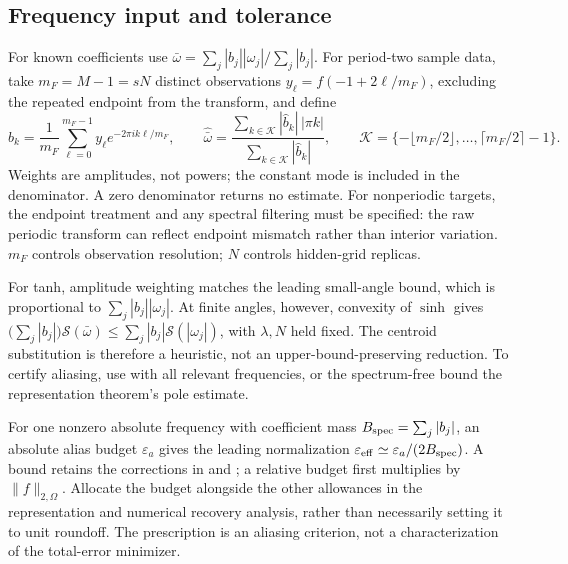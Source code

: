 \documentclass[11pt]{article}
\begin{document}
\subsection{Frequency input and tolerance}
For known coefficients use
$\bar\omega=\sum_j|b_j||\omega_j|/\sum_j|b_j|$.
For period-two sample data, take $m_F=M-1=sN$ distinct observations
$y_\ell=f(-1+2\ell/m_F)$, excluding the repeated endpoint from the transform,
and define
\begin{equation}
 \widehat b_k=\frac1{m_F}\sum_{\ell=0}^{m_F-1}
      y_\ell e^{-2\pi i k\ell/m_F},\qquad
 \widehat{\bar\omega}
 =\frac{\sum_{k\in\mathcal K}|\widehat b_k|\,|\pi k|}
        {\sum_{k\in\mathcal K}|\widehat b_k|},\qquad
 \mathcal K=\{-\lfloor m_F/2\rfloor,\ldots,\lceil m_F/2\rceil-1\}.
 \label{eq:bandwidth-frequency-estimate}
\end{equation}
Weights are amplitudes, not powers; the constant mode is included in the
denominator. A zero denominator returns no estimate. For nonperiodic targets,
the endpoint treatment and any spectral filtering must be specified: the raw
periodic transform can reflect endpoint mismatch rather than interior
variation. $m_F$ controls observation resolution; $N$ controls hidden-grid replicas.

For tanh, amplitude weighting matches the leading small-angle bound, which is
proportional to $\sum_j|b_j||\omega_j|$. At finite angles, however, convexity
of $\sinh$ gives
$\bigl(\sum_j|b_j|\bigr)\mathcal S(\bar\omega)
 \le\sum_j|b_j|\mathcal S(|\omega_j|)$,
with $\lambda,N$ held fixed. The centroid substitution is therefore a
heuristic, not an upper-bound-preserving reduction. To certify aliasing, use
 with all relevant frequencies, or the
spectrum-free bound the representation theorem's pole estimate.

For one nonzero absolute frequency with coefficient mass
$B_{\rm spec}=\sum_j|b_j|$, an absolute alias budget $\varepsilon_a$ gives
the leading normalization $\varepsilon_{\rm eff}\simeq
\varepsilon_a/(2B_{\rm spec})$. A bound retains the corrections in
 and
; a relative budget first multiplies by
$\|f\|_{2,\Omega}$. Allocate the budget alongside the other allowances in
the representation and numerical recovery analysis, rather than necessarily setting it to unit
roundoff. The prescription is an aliasing criterion, not a characterization
of the total-error minimizer.
\end{document}
